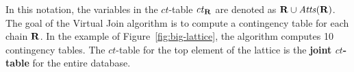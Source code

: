 \documentclass{acm_proc_article-sp}
\newcommand{\ct}{\mathit{ct}}
\begin{document}
In this notation, the variables in the $\ct$-table  $\ct_{\set{\Relation}}$  are denoted as $\mathbf{R} \cup \it{Atts}({\mathbf{R}})$. 
%
%
The goal of the Virtual Join algorithm is to compute a contingency table for each chain $\mathbf{R}$. 
In the example of Figure~\ref{fig:big-lattice}, the algorithm computes 10 contingency tables. The $\ct$-table for the top element of the lattice is the \textbf{joint $\ct$-table} for the entire database. 
\end{document}
